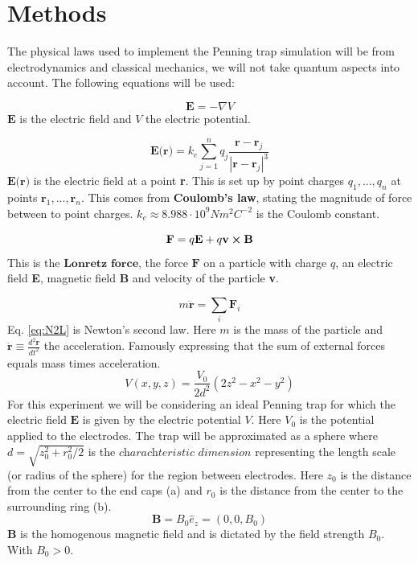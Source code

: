 \documentclass[english,notitlepage,reprint,nofootinbib]{revtex4-1}  %
\begin{document}
\section{Methods}\label{sec:methods}
The physical laws used to implement the Penning trap simulation will be from electrodynamics and classical mechanics, we will not take quantum aspects into account.
The following equations will be used:

\begin{equation}\label{eq:el_field}
    \textbf{E} = - \nabla V
\end{equation}
$\textbf{E}$ is the electric field and $V$ the electric potential.

\begin{equation}\label{eq:el_at_r}
    \textbf{E(r)} = k_e \sum_{j=1}^{n} q_j \frac{\textbf{r} - \textbf{r}_j}{|\textbf{r} - \textbf{r}_j|^3}
\end{equation}
$\textbf{E(r)}$ is the electric field at a point \textbf{r}. This is set up by point charges ${q_1,...,q_n}$ at points ${\textbf{r}_1,...,\textbf{r}_n}$. This comes from \textbf{Coulomb's law}, stating the magnitude of force between to point charges. $k_e \approx 8.988 \cdot 10^9 N m^2 C^{-2}$ is the Coulomb constant.

\begin{equation}\label{eq:lorentz}
    \textbf{F} = q\textbf{E} + q \textbf{v} \cross \textbf{B}
\end{equation}
This is the $\textbf{Lonretz force}$, the force $\textbf{F}$ on a particle
with charge $q$, an electric field \textbf{E}, magnetic field \textbf{B} and velocity of the particle \textbf{v}.

\begin{equation}\label{eq:N2L}
    m \ddot{\textbf{r}} = \sum_i \textbf{F}_i
\end{equation}
Eq. \ref{eq:N2L} is Newton's second law. Here $m$ is the mass of the particle and $\ddot{\textbf{r}} \equiv \frac{d^2 \textbf{r}}{dt^2}$ the acceleration.
Famously expressing that the sum of external forces equals mass times acceleration.
\begin{equation}\label{eq:el_potential}
    V(x,y,z) = \frac{V_0}{2d^2} (2z^2 - x^2 - y^2)
\end{equation}
For this experiment we will be considering an ideal Penning trap for which the electric field $\textbf{E}$ is given by the electric potential $V$.
Here $V_0$ is the potential applied to the electrodes. The trap will be approximated as a sphere where $d = \sqrt{z_0^2 + r_0^2 / 2}$ is the
$\textit{charachteristic dimension}$ representing the length scale (or radius of the sphere)
for the region between electrodes. Here $z_0$ is the distance from the center to the end caps (a) and $r_0$ is the distance from the center
to the surrounding ring (b).
\begin{equation}\label{eq:mag_field}
    \textbf{B} = B_0 \hat{e}_z = (0,0,B_0)
\end{equation}
$\textbf{B}$ is the homogenous magnetic field and is dictated by the field strength $B_0$. With $B_0 > 0$.
\end{document}
